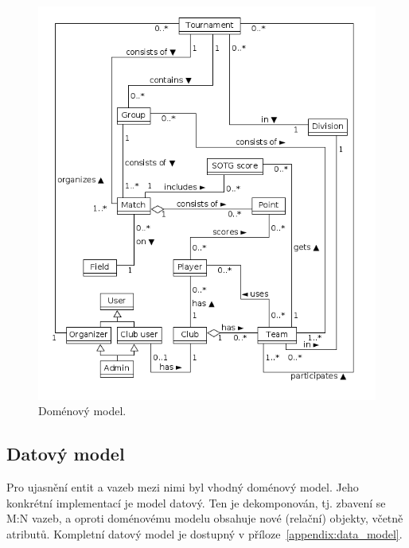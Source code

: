\begin{figure}[ht!]
\centering
\includegraphics[width=130mm]{./images/domenovy-model.png}
\caption{Doménový model.\label{overflow}}
\label{fig:domain_model}
\end{figure}

\subsection{Datový model}

\indent

Pro ujasnění entit a vazeb mezi nimi byl vhodný doménový model. Jeho konkrétní implementací je model datový.
Ten je dekomponován, tj. zbavení se M:N vazeb, a oproti doménovému modelu obsahuje nové
(relační) objekty, včetně atributů. Kompletní datový model je dostupný v příloze~\ref{appendix:data_model}.